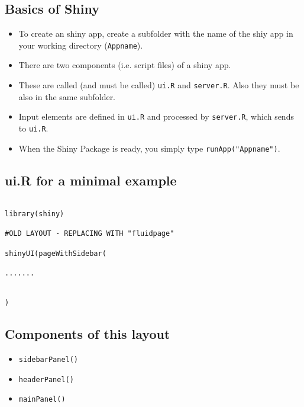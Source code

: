 \documentclass[a4paper,12pt]{article}
\begin{document}
\subsection*{Basics of Shiny}

\begin{itemize}

\item To create an shiny app, create a subfolder with the name of the shiy app in your working directory (\texttt{Appname}).

\item There are two components (i.e. script files) of a shiny app.

\item These are called (and must be called) \texttt{ui.R} and
 \texttt{server.R}. 
Also they must be also in the same subfolder.

\item Input elements are defined in \texttt{ui.R}  and processed by \texttt{server.R}, which sends to \texttt{ui.R}.

\item When the Shiny Package is ready, you simply type \texttt{runApp("Appname")}.

\end{itemize}

\subsection*{ui.R for a minimal example}
\begin{framed}
\begin{verbatim}

library(shiny)

#OLD LAYOUT - REPLACING WITH "fluidpage"

shinyUI(pageWithSidebar(

.......


)
\end{verbatim}
\end{framed}
\subsection*{Components of this layout}
\begin{itemize}
\item \texttt{sidebarPanel()}
\item \texttt{headerPanel()}
\item \texttt{mainPanel()}
\end{itemize}
\end{document}
